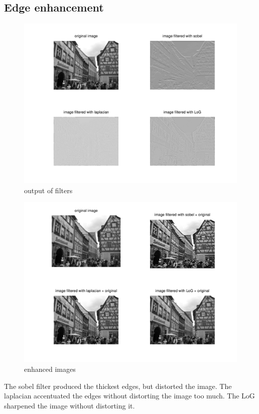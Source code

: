 \documentclass{article}
\begin{document}
	\subsection{Edge enhancement}
	\begin{figure}[H]
		\includegraphics[width=\linewidth]{Q6/partB1.png}
		\caption{output of filters}
	\end{figure}
	
	\begin{figure}[H]
		\includegraphics[width=\linewidth]{Q6/partB2.png}
		\caption{enhanced images}
	\end{figure}
	The sobel filter produced the thickest edges, but distorted the image. The laplacian accentuated the edges without distorting the image too much. The LoG sharpened the image without distorting it.
	
\end{document}
